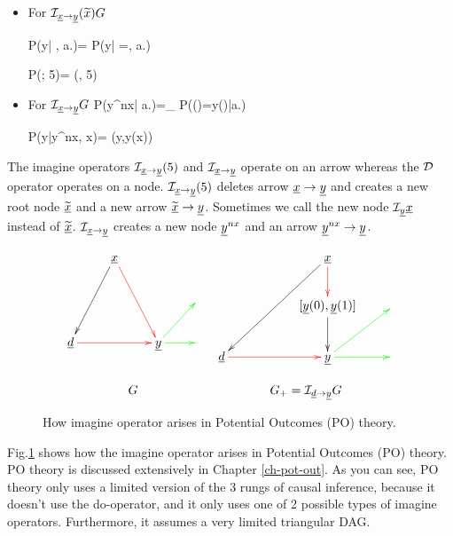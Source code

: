 \begin{itemize}

\item
For ${\cal I}_{{\underline{x}}\rightarrow
{\underline{y}}}(\widetilde{x})G$

\beq\color{blue}
P(y| , a.)=
P(y| \rvx=, a.)
\eeq

\beq\color{blue}
P(; 5)=
\delta(, 5)
\eeq

\item
For ${\cal I}_{{\underline{x}}\rightarrow {\underline{y}}}G$
\beq\color{blue}
P(y^{nx}| a.)=\prod_{}
P(\rvy()=y()|a.)
\eeq

\beq\color{blue}
P(y|y^{nx}, x)=
\delta(y,y(x))
\eeq
\end{itemize}
The imagine operators
${\cal I}_{{\underline{x}}\rightarrow{\underline{y}}}(5)$
and ${\cal I}_{{\underline{x}}\rightarrow{\underline{y}}}$
operate on an arrow
whereas the
${\cal D}$ operator
 operates on a node.
${\cal I}_{{\underline{x}}\rightarrow{\underline{y}}}(5)$
deletes
arrow ${\underline{x}}\rightarrow{\underline{y}}$
and
creates a new root node
$\widetilde{{\underline{x}}}$
and a new arrow
$\widetilde{{\underline{x}}}\rightarrow {\underline{y}}$.
Sometimes we call
the new node
${\cal I}_{\underline{y}}{\underline{x}}$
instead of
 $\widetilde{{\underline{x}}}$.
${\cal I}_{{\underline{x}}\rightarrow{\underline{y}}}$
creates
a new node ${\underline{y}}^{nx}$
and an arrow ${\underline{y}}^{nx}\rightarrow {\underline{y}}$.



\begin{figure}[h!]
$$
\begin{array}{ccccc}
\xymatrix{
&\rvx\ar@[red][ddr]\ar[ddl]
\\
&&&
\\
\rvd\ar@[red][rr]
&
&\rvy\ar@[green][r]
\ar@[green][ur]
&
}
&
\xymatrix{
&&\rvx\ar[ddll]\ar@[red][d]
\\
&&[\rvy(0),\rvy(1)]\ar[d]
&
\\
\rvd\ar@[red][rr]
&
&\rvy\ar@[green][r]
\ar@[green][ur]
&
}
\\
\\
G&G_+=\cali_{\rvd\rarrow\rvy}G
\end{array}
$$
\caption{How
 imagine operator
arises in
Potential Outcomes (PO)
theory.
}
\label{fig-counterf-G-im-y0-y1}
\end{figure}
Fig.\ref{fig-counterf-G-im-y0-y1}
shows how the
imagine operator arises
in Potential Outcomes (PO) theory.
PO theory is discussed extensively
in Chapter \ref{ch-pot-out}.
As you can see, PO theory
only uses a limited version
of the 3 rungs
of causal inference, because it
doesn't use the do-operator,
and it only uses one
of 2 possible types of
imagine operators.
Furthermore,
it assumes a
very limited triangular DAG.


